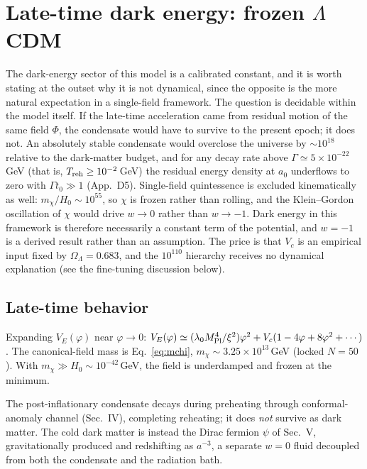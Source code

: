 \documentclass[pdflatex,sn-mathphys-num]{sn-jnl}
\providecommand{\gtrsim}{\geq}
\newcommand{\MP}{M_{\rm Pl}}
\theoremstyle{thmstyleone}
\begin{document}
\section{Late-time dark energy: frozen $\Lambda$CDM}

The dark-energy sector of this model is a calibrated constant, and it is worth stating at the outset why it is not dynamical, since the opposite is the more natural expectation in a single-field framework. The question is decidable within the model itself. If the late-time acceleration came from residual motion of the same field $\Phi$, the condensate would have to survive to the present epoch; it does not. An absolutely stable condensate would overclose the universe by $\sim10^{18}$ relative to the dark-matter budget, and for any decay rate above $\Gamma\simeq5\times10^{-22}\,$GeV (that is, $T_{\rm reh}\gtrsim10^{-2}\,$GeV) the residual energy density at $a_0$ underflows to zero with $\Gamma t_0\gg1$ (App.~D5). Single-field quintessence is excluded kinematically as well: $m_\chi/H_0\sim10^{55}$, so $\chi$ is frozen rather than rolling, and the Klein--Gordon oscillation of $\chi$ would drive $w\to0$ rather than $w\to-1$. Dark energy in this framework is therefore necessarily a constant term of the potential, and $w=-1$ is a derived result rather than an assumption. The price is that $V_c$ is an empirical input fixed by $\Omega_\Lambda=0.683$, and the $10^{110}$ hierarchy receives no dynamical explanation (see the fine-tuning discussion below).

\subsection{Late-time behavior}

Expanding $V_E(\varphi)$ near $\varphi\to0$: $V_E(\varphi)\simeq(\lambda_0\MP^4/\xi^2)\varphi^2+V_c(1-4\varphi+8\varphi^2+\cdots)$. The canonical-field mass is Eq.~\eqref{eq:mchi}, $m_\chi\sim3.25\times10^{13}\,$GeV (locked $N=50$). With $m_\chi\gg H_0\sim10^{-42}\,$GeV, the field is underdamped and frozen at the minimum.

The post-inflationary condensate decays during preheating through conformal-anomaly channel (Sec.~IV), completing reheating; it does \emph{not} survive as dark matter. The cold dark matter is instead the Dirac fermion $\psi$ of Sec.~V, gravitationally produced and redshifting as $a^{-3}$, a separate $w=0$ fluid decoupled from both the condensate and the radiation bath.
\end{document}
